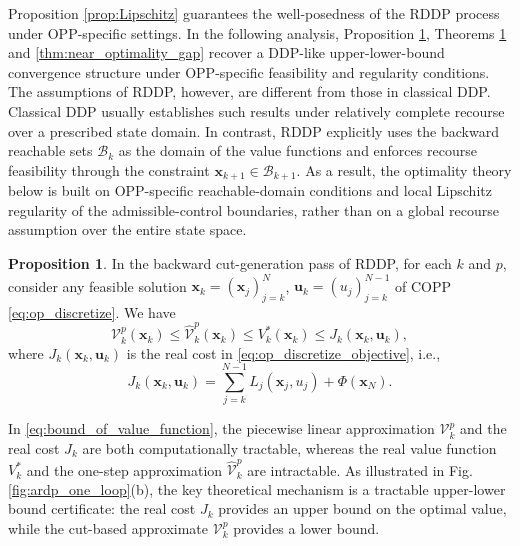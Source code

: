 \documentclass[journal]{IEEEtran}
\theoremstyle{definition}
\newtheorem{proposition}{Proposition}
\theoremstyle{definition}
\renewcommand\vector[1]{\boldsymbol{#1}}
\newcommand\vx{{\vector{x}}}
\newcommand\bx{{\mathbf{x}}}
\newcommand\bu{{\mathbf{u}}}
\begin{document}
Proposition \ref{prop:Lipschitz} guarantees the well-posedness of the RDDP process under OPP-specific settings. In the following analysis, Proposition \ref{prop:bound_of_value_function}, Theorems \ref{prop:bound_of_value_function} and \ref{thm:near_optimality_gap} recover a DDP-like upper-lower-bound convergence structure under OPP-specific feasibility and regularity conditions. The assumptions of RDDP, however, are different from those in classical DDP. Classical DDP usually establishes such results under relatively complete recourse over a prescribed state domain. In contrast, RDDP explicitly uses the backward reachable sets $\mathcal{B}_k$ as the domain of the value functions and enforces recourse feasibility through the constraint $\vx_{k+1}\in\mathcal{B}_{k+1}$. As a result, the optimality theory below is built on OPP-specific reachable-domain conditions and local Lipschitz regularity of the admissible-control boundaries, rather than on a global recourse assumption over the entire state space.

\begin{proposition}\label{prop:bound_of_value_function}
    In the backward cut-generation pass of RDDP, for each $k$ and $p$, consider any feasible solution $\bx_k=(\vx_j)_{j=k}^N$, $\bu_k=(u_j)_{j=k}^{N-1}$ of COPP \eqref{eq:op_discretize}. We have
    \begin{equation}\label{eq:bound_of_value_function}
        \mathcal{V}_k^p(\vx_k) \leq\widehat{\mathcal{V}}_k^p(\vx_k) \leq V_k^*(\vx_k) \leq J_k(\bx_k,\bu_k),
    \end{equation}
    where $J_k(\bx_k,\bu_k)$ is the real cost in \eqref{eq:op_discretize_objective}, i.e.,
    \begin{equation}
        J_k(\bx_k,\bu_k) = \sum_{j=k}^{N-1} L_j(\vx_j, u_j) + \Phi(\vx_N).
    \end{equation}
\end{proposition}

In \eqref{eq:bound_of_value_function}, the piecewise linear approximation $\mathcal{V}_k^p$ and the real cost $J_k$ are both computationally tractable, whereas the real value function $V_k^*$ and the one-step approximation $\widehat{\mathcal{V}}_k^p$ are intractable. As illustrated in Fig. \ref{fig:ardp_one_loop}(b), the key theoretical mechanism is a tractable upper-lower bound certificate: the real cost $J_k$ provides an upper bound on the optimal value, while the cut-based approximate $\mathcal{V}_k^p$ provides a lower bound.
\end{document}
